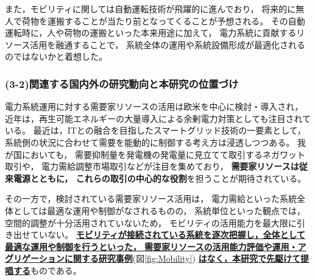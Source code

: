 \documentclass[11pt,a4paper,uplatex,dvipdfmx]{ujarticle} 		%
\newcommand{\研究課題名}{モビリティの時空間調整を活用した電力設備形成構築}
\newcommand{\研究機関名}{名古屋工業大学}
\newcommand{\研究代表者氏名}{中村勇太}
\newcommand{\研究期間の最終元号年度}{10}  %
\begin{document}
また，モビリティに関しては自動運転技術が飛躍的に進んでおり，
将来的に無人で荷物を運搬することが当たり前となってくることが予想される。
その自動運転時に，人や荷物の運搬といった本来用途に加えて，
電力系統に貢献するリソース活用を融通することで，
系統全体の運用や系統設備形成が最適化されるのではないかと着想した。


\vspace{-1\baselineskip}           %
\subsubsection*{(3-2)関連する国内外の研究動向と本研究の位置づけ}
\vspace{-0.5\baselineskip}           %

電力系統運用に対する需要家リソースの活用は欧米を中心に検討・導入され，
近年は，再生可能エネルギーの大量導入による余剰電力対策としても注目されている。
最近は，ITとの融合を目指したスマートグリッド技術の一要素として，
系統側の状況に合わせて需要を能動的に制御する考え方は浸透しつつある。
我が国においても，%
需要抑制量を発電機の発電量に見立てて取引するネガワット取引や，
電力需給調整市場取引などが注目を集めており，
\textbf{需要家リソースは従来電源とともに，
これらの取引の中心的な役割}を担うことが期待されている。

その一方で，検討されている需要家リソース活用は，%
電力需給といった系統全体としては最適な運用や制御がなされるものの，
系統単位といった観点では，空間的調整が十分活用されていないため，
モビリティの活用能力を最大限に引き出せていない。
\textbf{\ul{モビリティが接続されている系統を逐次把握し，全体として最適な運用や制御を行うといった，
需要家リソースの活用能力評価や運用・アグリゲーションに関する研究事例}}(図\ref{fig:Mobility})
\textbf{\ul{はなく，本研究で先駆けて提唱する}}ものである。
\end{document}
